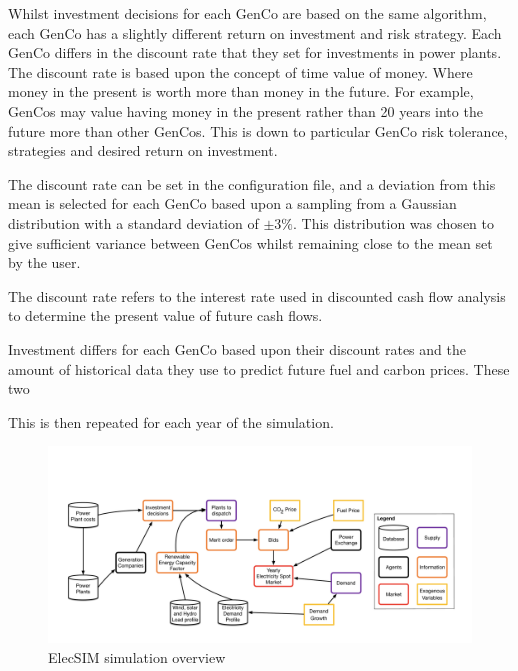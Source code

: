 Whilst investment decisions for each GenCo are based on the same algorithm, each GenCo has a slightly different return on investment and risk strategy. Each GenCo differs in the discount rate that they set for investments in power plants. The discount rate is based upon the concept of time value of money. Where money in the present is worth more than money in the future. For example, GenCos may value having money in the present rather than 20 years into the future more than other GenCos. This is down to particular GenCo risk tolerance, strategies and desired return on investment.

The discount rate can be set in the configuration file, and a deviation from this mean is selected for each GenCo based upon a sampling from a Gaussian distribution with a standard deviation of $\pm3\%$. This distribution was chosen to give sufficient variance between GenCos whilst remaining close to the mean set by the user.



The discount rate refers to the interest rate used in discounted cash flow analysis to determine the present value of future cash flows.


Investment differs for each GenCo based upon their discount rates and the amount of historical data they use to predict future fuel and carbon prices. These two 




This is then repeated for each year of the simulation.



\begin{figure}
	\centering
	\includegraphics[width=0.97\linewidth]{figures/low_level_system}
	\caption{ElecSIM simulation overview}
	\label{fig:lowlevelsystem}
\end{figure}


